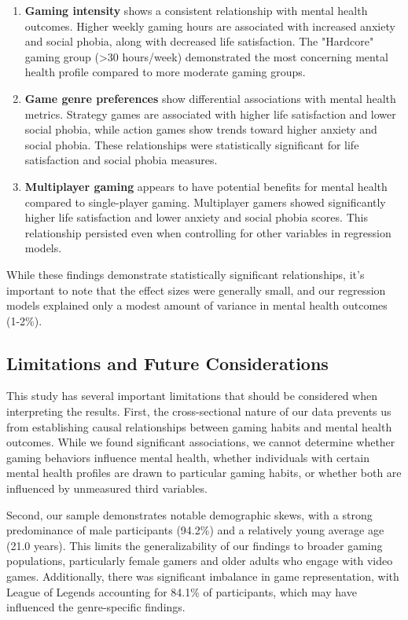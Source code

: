 \documentclass[12pt]{article}
\begin{document}
\begin{enumerate}
    \item \textbf{Gaming intensity} shows a consistent relationship with mental health outcomes. Higher weekly gaming hours are associated with increased anxiety and social phobia, along with decreased life satisfaction. The "Hardcore" gaming group (\textgreater30 hours/week) demonstrated the most concerning mental health profile compared to more moderate gaming groups.

    \item \textbf{Game genre preferences} show differential associations with mental health metrics. Strategy games are associated with higher life satisfaction and lower social phobia, while action games show trends toward higher anxiety and social phobia. These relationships were statistically significant for life satisfaction and social phobia measures.

    \item \textbf{Multiplayer gaming} appears to have potential benefits for mental health compared to single-player gaming. Multiplayer gamers showed significantly higher life satisfaction and lower anxiety and social phobia scores. This relationship persisted even when controlling for other variables in regression models.
\end{enumerate}

\noindent
While these findings demonstrate statistically significant relationships, it's important to note that the effect sizes were generally small, and our regression models explained only a modest amount of variance in mental health outcomes (1-2\%).

\subsection{Limitations and Future Considerations}

This study has several important limitations that should be considered when interpreting the results. First, the cross-sectional nature of our data prevents us from establishing causal relationships between gaming habits and mental health outcomes. While we found significant associations, we cannot determine whether gaming behaviors influence mental health, whether individuals with certain mental health profiles are drawn to particular gaming habits, or whether both are influenced by unmeasured third variables.

Second, our sample demonstrates notable demographic skews, with a strong predominance of male participants (94.2\%) and a relatively young average age (21.0 years). This limits the generalizability of our findings to broader gaming populations, particularly female gamers and older adults who engage with video games. Additionally, there was significant imbalance in game representation, with League of Legends accounting for 84.1\% of participants, which may have influenced the genre-specific findings.
\end{document}
